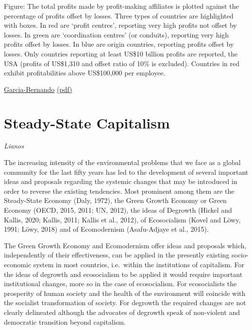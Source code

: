 \documentclass[
]{book}
\begin{document}
Figure: The total profits made by profit-making affiliates is plotted
against the percentage of profits offset by losses.
Three types of countries are highlighted with boxes.
In red are `profit centres', reporting very high profits not offset by losses.
In green are `coordination centres' (or conduits),
reporting very high profits offset by losses.
In blue are origin countries, reporting profits offset by losses.
Only countries reporting at least US\$10 billion profits are reported,
the USA (profits of US\$1,310 and offset ratio of 10\% is excluded).
Countries in red exhibit profitabilities above US\$100,000 per employee.

\href{https://www.ictd.ac/publication/profit-shifting-multinational-corporations-worldwide/}{Garcia-Bernando}
\href{pdf/Garcia_Bernando_2020_Profit-shifting.pdf}{(pdf)}

\hypertarget{steady-state-capitalism}{%
\section{Steady-State Capitalism}\label{steady-state-capitalism}}

\emph{Lianos}

The increasing intensity of the environmental problems that we face as a global community
for the last fifty years has led to the development of several important ideas and proposals
regarding the systemic changes that may be introduced in order to reverse the existing
tendencies. Most prominent among them are the Steady-State Economy (Daly, 1972), the
Green Growth Economy or Green Economy (OECD, 2015, 2011; UN, 2012), the ideas of
Degrowth (Hickel and Kallis, 2020; Kallis, 2011; Kallis et al., 2012), of Ecosocialism (Kovel
and Löwy, 1991; Löwy, 2018) and of Ecomodernism (Asafu-Adjaye et al., 2015).

The Green Growth Economy and Ecomodernism offer ideas and proposals which,
independently of their effectiveness, can be applied in the presently existing socio-economic
system in most countries, i.e.~within the institutions of capitalism. For the ideas of degrowth
and ecosocialism to be applied it would require important institutional changes, more so in the
case of ecosocialism. For ecosocialists the prosperity of human society and the health of the
environment will coincide with the socialist transformation of society. For degrowth the
required changes are not clearly delineated although the advocates of degrowth speak of
non-violent and democratic transition beyond capitalism.
\end{document}

